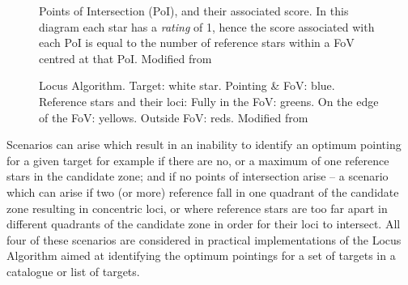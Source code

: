 \documentclass[referee]{aa}
\begin{document}
\begin{figure}[!htb]
\caption{\label{PoIscores}Points of Intersection (PoI), and their associated
score. In this diagram each star has a \textit{rating} of 1, hence the score
associated with each PoI is equal to the number of reference stars
within a FoV centred at that PoI. Modified from \citet{creaner2016thesis}}
\end{figure}

\begin{figure}[!htb]
\caption{\label{final}Locus Algorithm. Target: white star. Pointing \& FoV:
blue. Reference stars and their loci: Fully in the FoV: greens. On the
edge of the FoV: yellows. Outside FoV: reds.  Modified from \citet{creaner2016thesis}}
\end{figure}

Scenarios can arise which result in an inability to identify an optimum
pointing for a given target for example if there are no, or a maximum of
one reference stars in the candidate zone; and if no points of
intersection arise -- a scenario which can arise if two (or more)
reference fall in one quadrant of the candidate zone resulting in
concentric loci, or where reference stars are too far apart in different
quadrants of the candidate zone in order for their loci to intersect.
All four of these scenarios are considered in practical implementations
of the Locus Algorithm aimed at identifying the optimum pointings for a
set of targets in a catalogue or list of targets.
\end{document}
